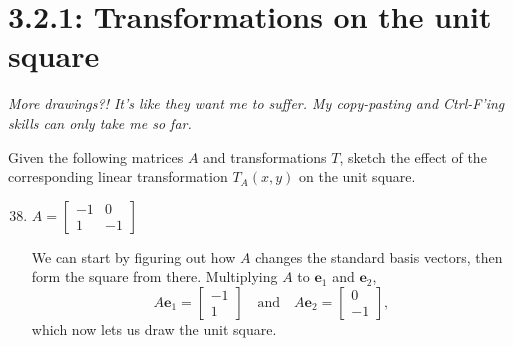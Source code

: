 \documentclass{article}
\begin{document}
\section*{3.2.1: Transformations on the unit square}
\textit{More drawings?! It's like they want me to suffer. My copy-pasting and Ctrl-F'ing skills can only take me so far. } 
\begin{center}
    \colorbox{CornflowerBlue!50}{
    \begin{minipage}[c]{0.9\textwidth}
        \centering
        Given the following matrices \(A\) and transformations \(T\), sketch the effect of the corresponding linear transformation \(T_A(x,y)\) on the unit square. 
    \end{minipage}
    }
\end{center}
\begin{enumerate}
    \setcounter{enumi}{37}
    \item \(A= \begin{bmatrix}
        -1&0 \\ 1&-1
    \end{bmatrix}\)\begin{solution}
        We can start by figuring out how \(A\) changes the standard basis vectors, then form the square from there. Multiplying \(A\) to \(\mathbf{e}_1\) and \(\mathbf{e}_2\),\[
            A\mathbf{e}_1 = \begin{bmatrix}
                -1\\1
            \end{bmatrix} \quad \text{and} \quad A\mathbf{e}_2 = \begin{bmatrix}
                0\\-1
            \end{bmatrix},
        \]which now lets us draw the unit square. 
    \end{solution}
    \begin{figure}[h]
        \centering
\end{figure}
\end{enumerate}
\end{document}
